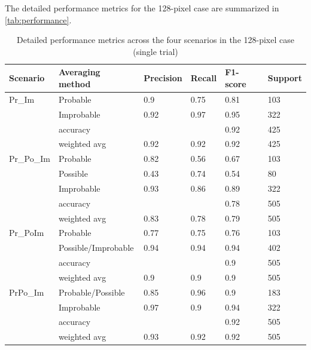 \documentclass[Journal,letterpaper, SingleSpace, InsideFigs]{ascelike-new}
\begin{document}
  The detailed performance metrics for the 128-pixel case are summarized in \autoref{tab:performance}.
  
\begin{table}[ht]\small
    \centering
\begin{tabular}{@{}llllll@{}}
\toprule
\textbf{Scenario} & \textbf{Averaging method} & \textbf{Precision} & \textbf{Recall} & \textbf{F1-score} & \textbf{Support} \\ \midrule
Pr\_Im    & Probable            & 0.9  & 0.75 & 0.81 & 103 \\
         & Improbable          & 0.92 & 0.97 & 0.95 & 322 \\
         & accuracy            &      &      & 0.92 & 425 \\
         & weighted avg        & 0.92 & 0.92 & 0.92 & 425 \\ \midrule
Pr\_Po\_Im & Probable            & 0.82 & 0.56 & 0.67 & 103 \\
         & Possible            & 0.43 & 0.74 & 0.54 & 80  \\
         & Improbable          & 0.93 & 0.86 & 0.89 & 322 \\
         & accuracy            &      &      & 0.78 & 505 \\
         & weighted avg        & 0.83 & 0.78 & 0.79 & 505 \\ \midrule
Pr\_PoIm  & Probable            & 0.77 & 0.75 & 0.76 & 103 \\
         & Possible/Improbable & 0.94 & 0.94 & 0.94 & 402 \\
         & accuracy            &      &      & 0.9  & 505 \\
         & weighted avg        & 0.9  & 0.9  & 0.9  & 505 \\ \midrule
PrPo\_Im  & Probable/Possible   & 0.85 & 0.96 & 0.9  & 183 \\
         & Improbable          & 0.97 & 0.9  & 0.94 & 322 \\
         & accuracy            &      &      & 0.92 & 505 \\
         & weighted avg        & 0.93 & 0.92 & 0.92 & 505 \\ \bottomrule
\end{tabular}
    \caption{Detailed performance metrics across the four scenarios in the 128-pixel case (single trial)}
    \label{tab:performance}
\end{table}


\end{document}
